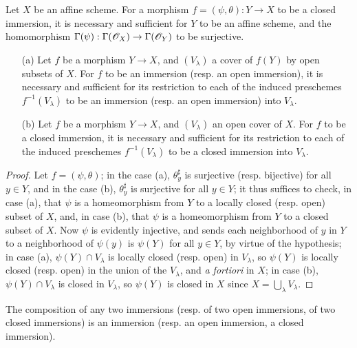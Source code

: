 \begin{corollary}[4.2.3]
\label{I.4.2.3}
Let $X$ be an affine scheme.
For a morphism $f=(\psi,\theta):Y\to X$ to be a closed immersion, it is necessary and sufficient for $Y$ to be an affine scheme, and the homomorphism $\Gamma(\psi):\Gamma(\sh{O}_X)\to\Gamma(\sh{O}_Y)$ to be surjective.
\end{corollary}

\begin{corollary}[4.2.4]
\label{I.4.2.4}
\medskip\noindent
\begin{enumerate}
  \item[{\rm(a)}] Let $f$ be a morphism $Y\to X$, and $(V_\lambda)$ a cover of $f(Y)$ by open subsets of $X$.
    For $f$ to be an immersion (resp. an open immersion), it is necessary and sufficient
    for its restriction to each of the induced preschemes $f^{-1}(V_\lambda)$ to be an immersion (resp. an open immersion) into $V_\lambda$.
  \item[{\rm(b)}] Let $f$ be a morphism $Y\to X$, and $(V_\lambda)$ an open cover of $X$.
    For $f$ to be a closed immersion, it is necessary and sufficient for its restriction to each of the induced preschemes $f^{-1}(V_\lambda)$ to be a closed immersion into $V_\lambda$.
\end{enumerate}
\end{corollary}

\begin{proof}
\label{proof-I.4.2.4}
Let $f=(\psi,\theta)$;
in the case (a), $\theta_y^\sharp$ is surjective (resp. bijective) for all $y\in Y$, and in the case (b), $\theta_y^\sharp$ is surjective for all $y\in Y$;
it thus suffices to check, in case (a), that $\psi$ is a homeomorphism from $Y$ to a locally closed (resp. open) subset of $X$, and, in case (b), that $\psi$ is a homeomorphism from $Y$ to a closed subset of $X$.
Now $\psi$ is evidently injective, and sends each neighborhood of $y$ in $Y$ to a neighborhood of $\psi(y)$ is $\psi(Y)$ for all $y\in Y$, by virtue of the hypothesis;
in case (a), $\psi(Y)\cap V_\lambda$ is locally closed (resp. open) in $V_\lambda$, so $\psi(Y)$ is locally closed (resp. open) in the union of the $V_\lambda$, and \emph{a fortiori} in $X$;
in case (b), $\psi(Y)\cap V_\lambda$ is closed in $V_\lambda$, so $\psi(Y)$ is closed in $X$ since $X=\bigcup_\lambda V_\lambda$.
\end{proof}

\begin{proposition}[4.2.5]
\label{I.4.2.5}
The composition of any two immersions (resp. of two open immersions, of two closed immersions) is an immersion (resp. an open immersion, a closed immersion).
\end{proposition}

